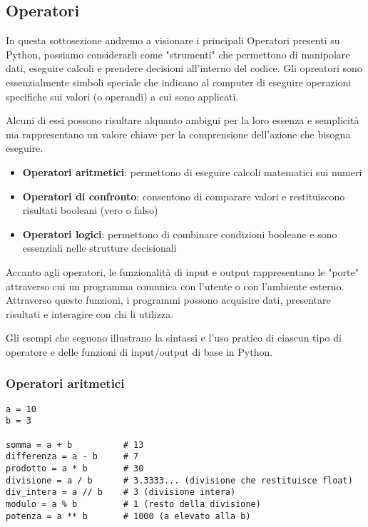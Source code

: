 \clearpage
\subsection{Operatori}\label{Operatori}
In questa sottosezione andremo a visionare i principali Operatori presenti su Python, possiamo considerarli come "strumenti" che permettono di manipolare dati, eseguire calcoli e prendere decisioni all'interno del codice. Gli opreatori sono essenzialmente simboli speciale che indicano al computer di eseguire operazioni specifiche sui valori (o operandi) a cui sono applicati.

Alcuni di essi possono risultare alquanto ambigui per la loro essenza e semplicità ma rappresentano un valore chiave per la comprensione dell'azione che bisogna eseguire.


\begin{itemize}
    \item \textbf{Operatori aritmetici}: permettono di eseguire calcoli matematici sui numeri
    \item \textbf{Operatori di confronto}: consentono di comparare valori e restituiscono risultati booleani (vero o falso)
    \item \textbf{Operatori logici}: permettono di combinare condizioni booleane e sono essenziali nelle strutture decisionali
\end{itemize}


Accanto agli operatori, le funzionalità di input e output rappresentano le "porte" attraverso cui un programma comunica con l'utente o con l'ambiente esterno. Attraverso queste funzioni, i programmi possono acquisire dati, presentare risultati e interagire con chi li utilizza.

Gli esempi che seguono illustrano la sintassi e l'uso pratico di ciascun tipo di operatore e delle funzioni di input/output di base in Python.


\subsubsection{Operatori aritmetici}\label{operatoriMatemateci}
\begin{lstlisting}
a = 10
b = 3

somma = a + b          # 13
differenza = a - b     # 7
prodotto = a * b       # 30
divisione = a / b      # 3.3333... (divisione che restituisce float)
div_intera = a // b    # 3 (divisione intera)
modulo = a % b         # 1 (resto della divisione)
potenza = a ** b       # 1000 (a elevato alla b)
\end{lstlisting}

